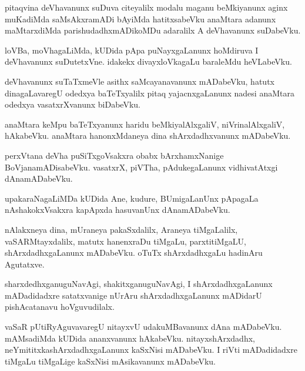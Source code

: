 \documentclass{article}
\begin{document}
\begin{mng}%
pitaqvina deVhavanunx suDuva citeyalilx modalu maganu beMkiyanunx
aginx muKadiMda saMsAkxramADi bAyiMda hatitxsabeVku anaMtara
adanunx maMtarxdiMda parishudadhxmADikoMDu adaralilx A deVhavanunx suDabeVku.
\end{mng}

\begin{mng}%
loVBa, moVhagaLiMda, kUDida pApa puNayxgaLanunx hoMdiruva 
I deVhavanunx suDutetxVne. idakekx divayxloVkagaLu baraleMdu
heVLabeVku.
\end{mng}

\begin{mng}%
deVhavanunx suTaTxmeVle asithx saMcayanavanunx mADabeVku,
hatutx dinagaLavaregU odedxya baTeTxyalilx pitaq yajacnxgaLanunx nadesi anaMtara
odedxya vasatxrXvanunx biDabeVku.
\end{mng}

\begin{mng}%
anaMtara keMpu baTeTxyanunx haridu beMkiyalAlxgaliV, niVrinalAlxgaliV,
hAkabeVku. anaMtara hanonxMdaneya dina shArxdadhxvanunx mADabeVku.
\end{mng}

\begin{mng}%
perxVtana deVha puSiTxgoVsakxra obabx bArxhamxNanige BoVjanamADisabeVku.
vasatxrX, piVTha, pAdukegaLanunx vidhivatAtxgi dAnamADabeVku.
\end{mng}

\begin{mng}%
upakaraNagaLiMDa kUDida Ane, kudure, BUmigaLanUnx pApagaLa
nAshakokxVsakxra kapApxda hasuvanUnx dAnamADabeVku.
\end{mng}

\begin{mng}%
nAlakxneya dina, mUraneya pakaSxdalilx, Araneya tiMgaLalilx,
vaSARMtayxdalilx, matutx hanenxraDu tiMgaLu, parxtitiMgaLU, shArxdadhxgaLanunx mADabeVku.
oTuTx shArxdadhxgaLu hadinAru Agutatxve.
\end{mng}

\begin{mng}%
sharxdedhxganuguNavAgi, shakitxganuguNavAgi, I shArxdadhxgaLanunx
mADadidadxre satatxvanige nUrAru shArxdadhxgaLanunx mADidarU pishAcatanavu
hoVguvudilalx.
\end{mng}

\begin{mng}%
vaSaR pUtiRyAguvavaregU nitayxvU udakuMBavanunx dAna
mADabeVku. mAMsadiMda kUDida ananxvanunx hAkabeVku. nitayxshArxdadhx,
neYmititxkashArxdadhxgaLanunx kaSxNisi mADabeVku. I riVti mADadidadxre tiMgaLu
tiMgaLige kaSxNisi mAsikavanunx mADabeVku.
\end{mng}
\end{document}
